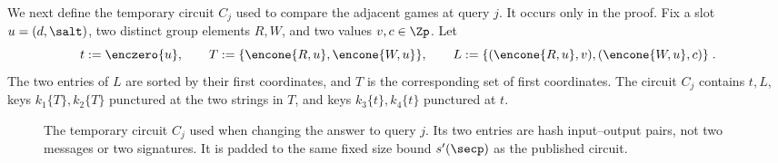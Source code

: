 We next define the temporary circuit $C_j$ used to compare the adjacent games at query $j$. It occurs only in the proof. Fix a slot $u=(d,\salt)$, two distinct group elements $R,W$, and two values $v,c \in \Zp$. Let
$$
t:=\enczero{u},\qquad
T:=\{\encone{R,u},\encone{W,u}\},
\qquad
L:=\{(\encone{R,u},v),(\encone{W,u},c)\} \;.
$$
The two entries of $L$ are sorted by their first coordinates, and $T$ is the corresponding set of first coordinates. The circuit $C_j$ contains $t,L$, keys $k_1\{T\},k_2\{T\}$ punctured at the two strings in $T$, and keys $k_3\{t\},k_4\{t\}$ punctured at $t$.

\begin{figure}[t]
\begin{center}
\end{center}
\vspace{-6pt}
\caption{The temporary circuit $C_j$ used when changing the answer to query $j$. Its two entries are hash input--output pairs, not two messages or two signatures. It is padded to the same fixed size bound $s'(\secp)$ as the published circuit.}\label{fig-circuit-query}
\vspace{-3pt}\hrulefill
\vspace{-1ex}
\end{figure}


